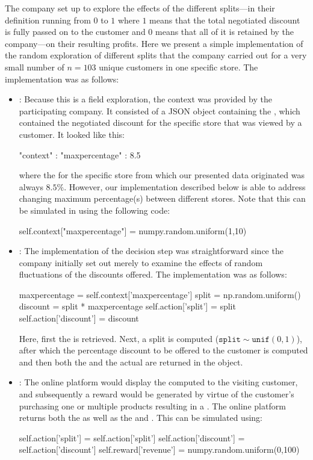 \documentclass[nojss]{jss}
\begin{document}
The company set up  to explore the effects of the different splits---in their definition running from $0$ to $1$ where $1$ means that the total negotiated discount is fully passed on to the customer and $0$ means that all of it is retained by the company---on their resulting profits. Here we present a simple implementation of the random exploration of different splits that the company carried out for a very small number of $n=103$ unique customers in one specific store. The implementation was as follows:

\begin{itemize}
\item {}: Because this is a field exploration, the context was provided by the participating company. It consisted of a JSON object containing the , which contained the negotiated discount for the specific store that was viewed by a customer. It looked like this:
\begin{Code}
{"context" : {"maxpercentage" : 8.5}}
\end{Code}
where the  for the specific store from which our presented data originated was always $8.5\%$. However, our implementation described below is able to address changing maximum percentage(s) between different stores. Note that this can be simulated in  using the following  code:
\begin{Code}
self.context["maxpercentage"] = numpy.random.uniform(1,10)
\end{Code}

\item {}: The implementation of the decision step was straightforward since the company initially set out merely to examine the effects of random fluctuations of the discounts offered. The implementation was as follows:
\begin{Code}
maxpercentage = self.context['maxpercentage']
split = np.random.uniform()
discount = split * maxpercentage
self.action['split'] = split 
self.action['discount'] = discount
\end{Code}
Here, first the  is retrieved. Next, a split is computed ($\texttt{split} \sim \texttt{unif}(0,1)$), after which the percentage discount to be offered to the customer is computed and then both the  and the actual  are returned in the  object.

\item {}: The online platform would display the computed  to the visiting customer, and subsequently a reward would be generated by virtue of the customer's purchasing one or multiple products resulting in a . The online platform returns both the  as well as the  and . 
This can be simulated using:
\begin{Code}
self.action['split'] = self.action['split']
self.action['discount'] = self.action['discount']
self.reward['revenue'] = numpy.random.uniform(0,100)
\end{Code}


\end{itemize}
\end{document}
